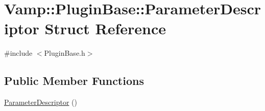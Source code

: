 \hypertarget{struct_vamp_1_1_plugin_base_1_1_parameter_descriptor}{}\section{Vamp\+:\+:Plugin\+Base\+:\+:Parameter\+Descriptor Struct Reference}
\label{struct_vamp_1_1_plugin_base_1_1_parameter_descriptor}


{\ttfamily \#include $<$Plugin\+Base.\+h$>$}

\subsection*{Public Member Functions}
\begin{DoxyCompactItemize}
\item 
\hyperlink{struct_vamp_1_1_plugin_base_1_1_parameter_descriptor_a5b793130e9746b2302317b3c9a9c1395}{Parameter\+Descriptor} ()
\end{DoxyCompactItemize}
